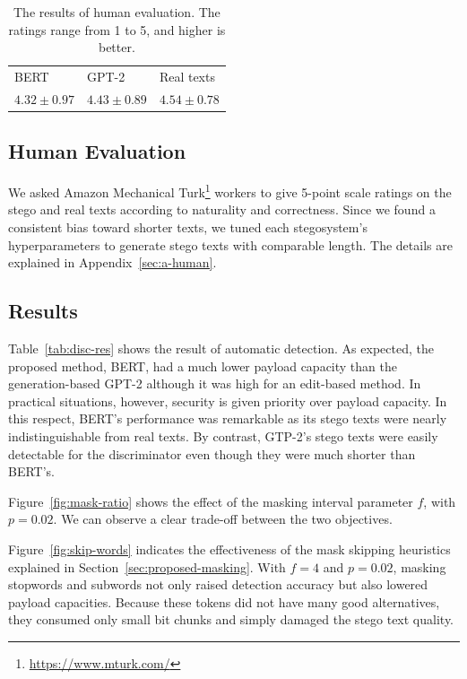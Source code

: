 \documentclass[11pt]{article}
\begin{document}
\begin{table}[t]
    \centering
    \begin{tabular}{|l|l|l|} \hline
        BERT & GPT-2 & Real texts \\
        $4.32\pm 0.97$ & $4.43\pm 0.89$ & $4.54 \pm 0.78$ \\ \hline
    \end{tabular}
    \caption{
    The results of human evaluation.
    The ratings range from 1 to 5, and higher is better. 
    }
    \label{tab:human-score}
\end{table}



\subsection{Human Evaluation}

We asked Amazon Mechanical Turk\footnote{\url{https://www.mturk.com/}} workers to give 5-point scale ratings on the stego and real texts according to naturality and correctness.
Since we found a consistent bias toward shorter texts, we tuned each stegosystem's hyperparameters to generate stego texts with comparable length.
The details are explained in Appendix~\ref{sec:a-human}.


\subsection{Results} \label{sec:exp-results}

Table~\ref{tab:disc-res} shows the result of automatic detection.
As expected, the proposed method, BERT, had a much lower payload capacity than the generation-based GPT-2 although it was high for an edit-based method.
In practical situations, however, security is given priority over payload capacity.
In this respect, BERT's performance was remarkable as its stego texts were nearly indistinguishable from real texts.
By contrast, GTP-2's stego texts were easily detectable for the discriminator even though they were much shorter than BERT's. 


Figure~\ref{fig:mask-ratio} shows the effect of the masking interval parameter $f$, with $p = 0.02$.
We can observe a clear trade-off between the two objectives.


Figure~\ref{fig:skip-words} indicates the effectiveness of the mask skipping heuristics explained in Section~\ref{sec:proposed-masking}.
With $f=4$ and $p=0.02$, masking stopwords and subwords not only raised detection accuracy but also lowered payload capacities.
Because these tokens did not have many good alternatives, they consumed only small bit chunks and simply damaged the stego text quality.
\end{document}
